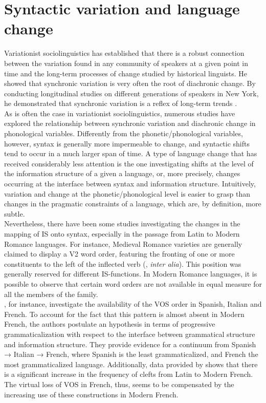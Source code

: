 \section{Syntactic variation and language change}
Variationist sociolinguistics has established that there is a robust connection between the variation found in any community of speakers at a given point in time and the long-term processes of change studied by historical linguists. He showed that synchronic variation is very often the root of diachronic change. By conducting longitudinal studies on different generations of speakers in New York, he demonstrated that synchronic variation is a reflex of long-term trends \parencite{weinreich1968empirical}.\\
As is often the case in variationist sociolinguistics, numerous studies have explored the relationship between synchronic variation and diachronic change in phonological variables. Differently from the phonetic/phonological variables, however, syntax is generally more impermeable to change, and syntactic shifts tend to occur in a much larger span of time.
A type of language change that has received considerably less attention is the one investigating shifts at the level of the information structure of a given a language, or, more precisely, changes occurring at the interface between syntax and information structure. Intuitively, variation and change at the phonetic/phonological level is easier to grasp than changes in the pragmatic constraints of a language, which are, by definition, more subtle.\\
Nevertheless, there have been some studies investigating the changes in the mapping of IS onto syntax, especially in the passage from Latin to Modern Romance languages. For instance, Medieval Romance varieties are generally claimed to display a V2 word order, featuring the fronting of one or more constituents to the left of the inflected verb (\cite{beninca2006detailed, ledgeway2012latin, salvi2011some, wolfe2015medieval, wolfe2024conspiracy}, \textit{inter alia}). This position was generally reserved for different IS-functions.
In Modern Romance languages, it is possible to observe that certain word orders are not available in equal measure for all the members of the family. \\
\textcite{lahousse2012word}, for instance, investigate the availability of the VOS order in Spanish, Italian and French. 
To account for the fact that this pattern is almost absent in Modern French, the authors postulate an  hypothesis in terms of progressive grammaticalization with respect to the interface between grammatical structure and information structure. They provide evidence for a continuum from Spanish → Italian → French, where Spanish is the least grammaticalized, and French the most grammaticalized language. Additionally, data provided by \textcite{dufter2008explaining} shows that there is a significant increase in the frequency of clefts from Latin to Modern French. The virtual loss of VOS in French, thus, seems to be compensated by the increasing use of these constructions in Modern French. \\
